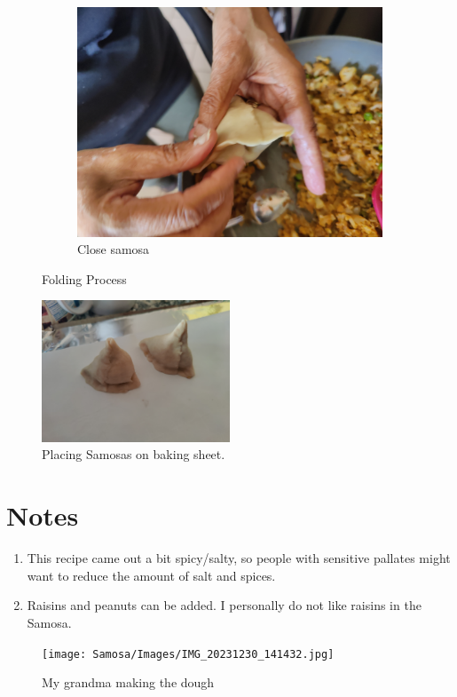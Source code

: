 \begin{figure}[H]
\begin{subfigure}{0.3\textwidth}
    \includegraphics[width=\linewidth]{Samosa/Images/IMG_20231230_143850.jpg}
    \caption{Close samosa}
  \end{subfigure}

  \caption{Folding Process}
  \label{fig:folds}
\end{figure}

\begin{figure}[H]
  \centering
  \includegraphics[width=0.5\textwidth]{Samosa/Images/IMG_20231230_143903.jpg}
  \caption{Placing Samosas on baking sheet.}
  \label{fig:fig1}
\end{figure}

\section*{Notes}
\begin{enumerate}
    \item This recipe came out a bit spicy/salty, so people with sensitive pallates might want to reduce the amount of salt and spices.
    \item Raisins and peanuts can be added. I personally do not like raisins in the Samosa.
\end{enumerate}

\begin{figure}[H]
  \centering
  \texttt{[image: Samosa/Images/IMG\_20231230\_141432.jpg]}
  \caption{My grandma making the dough}
  \label{fig:fig1}
\end{figure}

